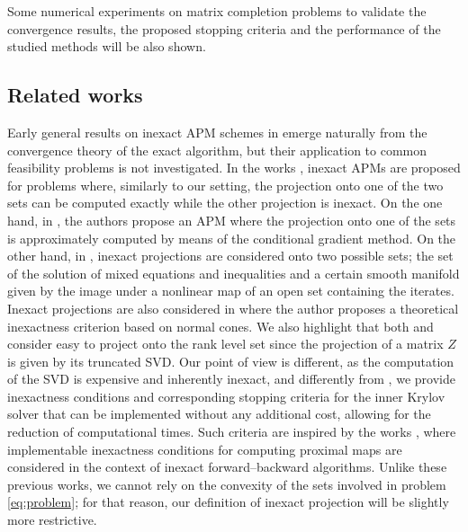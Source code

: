 \documentclass[pdflatex,sn-mathphys-num]{sn-jnl}
\numberwithin{equation}{section}%
\theoremstyle{thmstyleone}%
\theoremstyle{thmstyletwo}%
\theoremstyle{thmstylethree}%
\begin{document}
Some numerical experiments on matrix completion problems to validate the convergence results, the proposed stopping criteria and the performance of the studied methods will be also shown.

\subsection{Related works}
Early general results on inexact APM schemes in \cite{kruger} emerge naturally from the convergence theory of the exact algorithm, but their application to common feasibility problems is not investigated. In the works \cite{ferreira_inexact_2021,drusvyatskiy2019local}, inexact APMs are proposed for problems where, similarly to our setting, the projection onto one of the two sets can be computed exactly while the other projection is inexact. On the one hand, in \cite{ferreira_inexact_2021}, the authors propose an APM where the projection onto one of the sets is approximately computed by means of the conditional gradient method.
On the other hand, in \cite{drusvyatskiy2019local}, inexact projections are considered onto two possible sets; the set of the solution of mixed equations and inequalities and a certain smooth manifold given by the image under a nonlinear map of an open set containing the iterates. Inexact projections are also considered in \cite{luke2013prox} where the author proposes a theoretical inexactness criterion based on normal cones.
We also highlight that both \cite{drusvyatskiy2019local} and \cite{luke2013prox} consider easy to project onto the rank level set since the projection of a matrix $Z$  is given by its  truncated SVD.
Our point of view is different, as the computation of the SVD is expensive and inherently inexact, and differently from \cite{luke2013prox}, we provide inexactness conditions and corresponding stopping criteria for the inner Krylov solver that can be implemented without any additional cost, allowing for the reduction of computational times. Such criteria are inspired by the works \cite{Bonettini-Prato-Rebegoldi-2020,Bonettini-Prato-Rebegoldi-2021,Bonettini-Ochs-Prato-Rebegoldi-2023}, where implementable inexactness conditions for computing proximal maps are considered in the context of inexact forward--backward algorithms. Unlike these previous works, we cannot rely on the convexity of the sets involved in problem \eqref{eq:problem}; for that reason, our definition of inexact projection will be slightly more restrictive.
\end{document}

